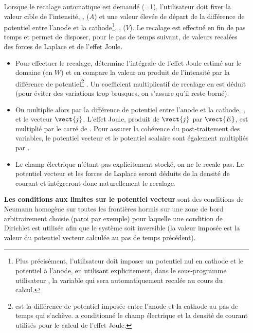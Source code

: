 Lorsque le recalage automatique est demand\'e (=1), l'utilisateur doit fixer la
valeur cible de l'intensit\'e, , ($A$) et une valeur \'elev\'ee
de d\'epart
de la diff\'erence de potentiel entre l'anode et la cathode\footnote{Plus pr\'ecis\'ement, l'utilisateur doit imposer un potentiel nul
en cathode et le potentiel  \`a l'anode, en utilisant explicitement,
dans le sous-programme utilisateur , la variable  qui
sera automatiquement recal\'ee au cours du calcul.}, , ($V$).
Le recalage est effectu\'e en fin de pas temps et permet de disposer, pour le pas
de temps suivant, de valeurs recal\'ees des forces de Laplace et de l'effet
Joule.
\begin{itemize}
\item Pour effectuer le recalage, \CS d\'etermine l'int\'egrale de l'effet Joule
estim\'e sur le domaine (en $W$) et en compare la
valeur au produit de l'intensit\'e  par la diff\'erence de
potentiel\footnote{ est la diff\'erence de
potentiel impos\'ee entre l'anode et la cathode au
pas de temps qui s'ach\`eve.  a conditionn\'e le champ \'electrique et
la densit\'e de courant utilis\'es pour le calcul de l'effet Joule.} .
Un coefficient multiplicatif de recalage  en
est d\'eduit (pour \'eviter des variations trop brusques,
on s'assure qu'il reste born\'e). %
\item On multiplie alors par  la
diff\'erence de potentiel entre l'anode et la cathode, , et le vecteur $\vect{j}$. L'effet
Joule, produit de $\vect{j}$ par $\vect{E}$, est multipli\'e par
le carr\'e de . Pour assurer la coh\'erence du post-traitement des
variables, le potentiel vecteur et le potentiel scalaire sont \'egalement
multipli\'es par .
\item Le champ \'electrique n'\'etant pas explicitement
stock\'e, on ne le recale pas. Le potentiel vecteur et les forces de Laplace seront d\'eduits de la
densit\'e de courant et int\'egreront donc naturellement le recalage.
\end{itemize}

\bigskip
{\bf Les conditions aux limites sur le potentiel vecteur} sont des conditions de
Neumann homog\`ene sur toutes les fronti\`eres hormis sur une zone de bord
arbitrairement choisie (paroi par exemple) pour laquelle une condition de
Dirichlet est utilis\'ee afin que le syst\`eme soit inversible
(la valeur impos\'ee est la valeur du potentiel vecteur
calcul\'ee au pas de temps pr\'ec\'edent).



